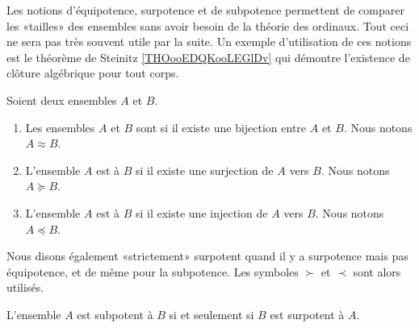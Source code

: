 Les notions d'équipotence, surpotence et de subpotence permettent de comparer les «tailles» des ensembles sans avoir besoin de la théorie des ordinaux. Tout ceci ne sera pas très souvent utile par la suite. Un exemple d'utilisation de ces notions est le théorème de Steinitz \ref{THOooEDQKooLEGlDv} qui démontre l'existence de clôture algébrique pour tout corps.

\begin{definition}      \label{DEFooXGXZooIgcBCg}
    Soient deux ensembles \( A\) et \( B\).
    \begin{enumerate}
        \item
            Les ensembles \( A\) et \( B\) sont  si il existe une bijection entre \( A\) et \( B\). Nous notons \( A\approx B\).
        \item
            L'ensemble \( A\) est  à \( B\) si il existe une surjection de \( A\) vers \( B\). Nous notons \( A\succeq B\).
        \item
            L'ensemble \( A\) est  à \( B\) si il existe une injection de \( A\) vers \( B\). Nous notons \( A\preceq B\).
    \end{enumerate}
    Nous disons également «strictement» surpotent quand il y a surpotence mais pas équipotence, et de même pour la subpotence. Les symboles \( \succ\) et \( \prec\) sont alors utilisés.
\end{definition}

\begin{proposition}      \label{PROPooWSXTooMQPcNG}
    L'ensemble \( A\) est subpotent à \( B\) si et seulement si \( B\) est surpotent à \( A\).
\end{proposition}

